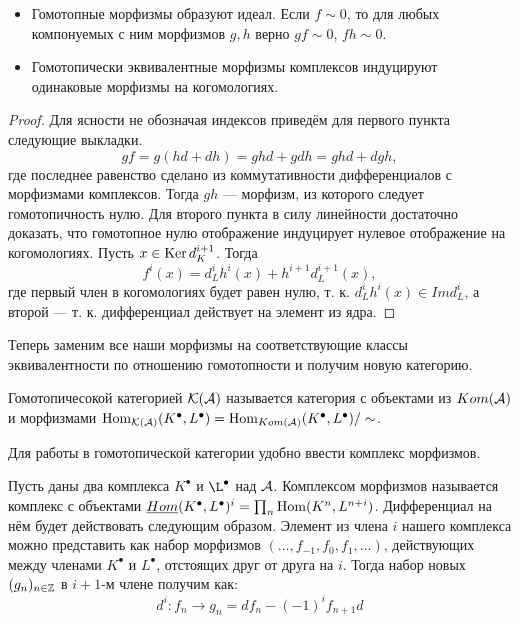 \documentclass[../main.tex]{subfiles}
\begin{document}
\begin{to_suj}
$ $
\begin{itemize}
    \item Гомотопные морфизмы образуют идеал. Если $f\sim 0$, то для любых компонуемых с ним морфизмов $g, h$ верно $gf\sim 0$, $fh\sim 0$.
    \item Гомотопически эквивалентные морфизмы комплексов индуцируют одинаковые морфизмы на когомологиях.
\end{itemize}
\end{to_suj}
\begin{proof}
Для ясности не обозначая индексов приведём для первого пункта следующие выкладки.
\begin{equation*}
        gf = g(hd + dh) = ghd + gdh = ghd + dgh,
\end{equation*}
где последнее равенство сделано из коммутативности дифференциалов с морфизмами комплексов. Тогда $gh$ --- морфизм, из которого следует гомотопичность нулю.
Для второго пункта в силу линейности достаточно доказать, что гомотопное нулю отображение индуцирует нулевое отображение на когомологиях. Пусть $x\in \mathop{\mathrm{Ker}}\nolimits d_K^{i+1}$. Тогда
    \begin{equation*}
        f^i(x) = d_L^{i}h^{i}(x) + h^{i+1}d_L^{i+1}(x),
    \end{equation*}
    где первый член в когомологиях будет равен нулю, т. к. $d_L^{i}h^{i}(x)\in Imd_L^{i}$, а второй --- т. к. дифференциал действует на элемент из ядра.
\end{proof}
Теперь заменим все наши морфизмы на соответствующие классы эквивалентности по отношению гомотопности и получим новую категорию.
\begin{to_def}
Гомотопичесокой категорией $\mathcal{K(\mathcal{A})}$ называется категория с объектами из $Kom(\mathcal{A})$ и морфизмами $\operatorname{Hom}_{\mathcal{K(\mathcal{A})}} (K^\bullet, L^\bullet) = \operatorname{Hom}_{Kom(\mathcal{A})} (K^\bullet, L^\bullet)/\sim$.
\end{to_def}
Для работы в гомотопической категории удобно ввести комплекс морфизмов.
\begin{to_def}
\label{hHom}
Пусть даны два комплекса $K^\bullet$ и $\L^\bullet$ над $\mathcal{A}$. Комплексом морфизмов называется комплекс с объектами $\underline{Hom} (K^\bullet, L^\bullet)^i = \prod_n \operatorname{Hom}(K^n, L^{n+i})$. Дифференциал на нём будет действовать следующим образом. Элемент из члена $i$ нашего комплекса можно представить как набор морфизмов $(\ldots, f_{-1}, f_0, f_1, \ldots)$, действующих между членами $K^\bullet$ и $L^\bullet$, отстоящих друг от друга на $i$. Тогда набор новых $(g_n)_{n\in\mathbb{Z}}$ в $i+1$-м члене получим как:
\begin{equation*}
    d^i: f_n \to g_n = df_n - (-1)^if_{n+1}d
\end{equation*}
\end{to_def}
\end{document}
